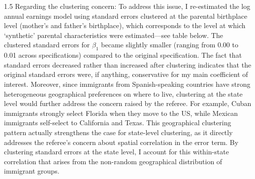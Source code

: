 \documentclass[12pt,english]{article}
\newcommand{\rrxspc}{1.5}
\begin{document}
\begin{refsection}
\begin{spacing}{\rrxspc}
    Regarding the clustering concern: To address this issue, I re-estimated the log annual earnings model using standard errors clustered at the parental birthplace level (mother's and father's birthplace), which corresponds to the level at which `synthetic' parental characteristics were estimated---see table below. The clustered standard errors for $\beta_1$ became slightly smaller (ranging from 0.00 to 0.01 across specifications) compared to the original specification. The fact that standard errors decreased rather than increased after clustering indicates that the original standard errors were, if anything, conservative for my main coefficient of interest. Moreover, since immigrants from Spanish-speaking countries have strong heterogeneous geographical preferences on where to live, clustering at the state level would further address the concern raised by the referee. For example, Cuban immigrants strongly select Florida when they move to the US, while Mexican immigrants self-select to California and Texas. This geographical clustering pattern actually strengthens the case for state-level clustering, as it directly addresses the referee's concern about spatial correlation in the error term. By clustering standard errors at the state level, I account for this within-state correlation that arises from the non-random geographical distribution of immigrant groups.
    
\end{spacing}


\restoregeometry


\end{refsection}
\end{document}
